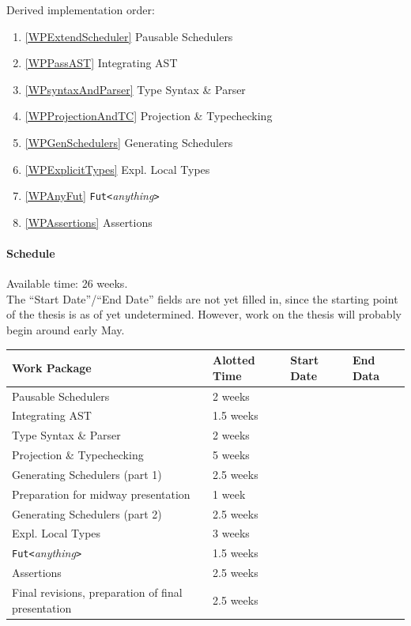\documentclass[paper=a4,nochapname,accentcolor=tud9c]{tudexercise}
\begin{document}
Derived implementation order:
\begin{enumerate}[label=(\arabic*)]
  \item \label{orderExtendScheduler} \ref{WPExtendScheduler} Pausable Schedulers
  \item \label{orderPassAST} \ref{WPPassAST} Integrating AST
  \item \label{ordersyntaxAndParser} \ref{WPsyntaxAndParser} Type Syntax \& Parser
  \item \label{orderProjectionAndTC} \ref{WPProjectionAndTC} Projection \& Typechecking
  \item \label{orderGenSchedulers} \ref{WPGenSchedulers} Generating Schedulers
  \item \label{orderExplicitTypes} \ref{WPExplicitTypes} Expl. Local Types
  \item \label{orderAnyFut} \ref{WPAnyFut} \texttt{Fut<}\emph{anything}\texttt{>}
  \item \label{orderAssertions} \ref{WPAssertions} Assertions
\end{enumerate}

\paragraph{Schedule}%
%
Available time: 26 weeks.
\\
The ``Start Date''/``End Date'' fields are not yet filled in, since the
starting point of the thesis is as of yet undetermined.
However, work on the thesis will probably begin around early May.

\medskip

\begin{tabular}{llll}
Work Package & Alotted Time & Start Date & End Data \\
\hline
Pausable Schedulers & 2 weeks & & \\
Integrating AST & 1.5 weeks & & \\
Type Syntax \& Parser & 2 weeks & & \\
Projection \& Typechecking & 5 weeks & & \\
Generating Schedulers (part 1) & 2.5 weeks & & \\
Preparation for midway presentation & 1 week & & \\
Generating Schedulers (part 2) & 2.5 weeks & & \\
Expl. Local Types & 3 weeks & & \\
\texttt{Fut<}\emph{anything}\texttt{>} & 1.5 weeks & & \\
Assertions & 2.5 weeks & & \\
Final revisions, preparation of final presentation & 2.5 weeks & &
\end{tabular}
\end{document}
